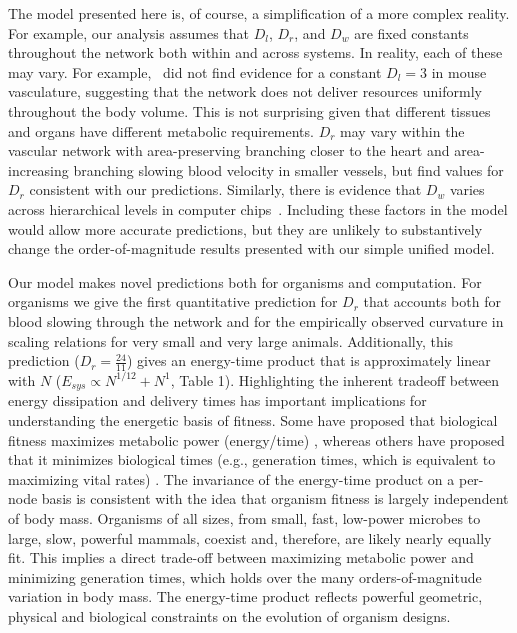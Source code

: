 \documentclass[12pt]{article}
\begin{document}
The model presented here is, of course, a simplification of a more
complex reality. For example, our analysis assumes that $D_l$, $D_r$,
and $D_w$ are fixed constants throughout the network both within and
across systems. In reality, each of these may vary.  For
example,~\cite{newberry2015testing} did not find evidence for a
constant $D_l = 3$ in mouse vasculature, suggesting that the network
does not deliver resources uniformly throughout the body volume. This
is not surprising given that different tissues and organs have
different metabolic requirements. $D_r$ may vary
within the vascular network with area-preserving branching closer to the heart and area-increasing branching slowing blood velocity in smaller
vessels, but \cite{newberry2015testing} find values for $D_r$
consistent with our predictions.  Similarly, there is evidence that
$D_w$ varies across hierarchical levels in computer
chips~\cite{ozaktas2004information}. Including these factors in the
model would allow more accurate predictions, but they are unlikely to
substantively change the order-of-magnitude results presented
with our simple unified model.

Our model makes novel predictions both for organisms and
computation. For organisms we give the first quantitative prediction
for $D_r$ that accounts both for blood slowing through the network and
for the empirically observed curvature in scaling relations for very
small and very large animals. Additionally, 
this prediction ($D_r = \frac{24}{11}$) gives an energy-time product that is approximately linear with $N$ ($E_{sys} \propto N^{1/12} + N^1$, Table 1). Highlighting the inherent tradeoff between energy dissipation and delivery times 
has important implications for understanding the energetic basis of fitness.  Some have proposed that biological fitness
maximizes metabolic power (energy/time) \cite{lotka56, odum71}, whereas others
have proposed that it minimizes biological times (e.g., generation times, which
is equivalent to maximizing vital rates) \cite{lindstedt81, sibly91}. The
invariance of the energy-time product on a per-node basis is
consistent with the idea that organism fitness
is largely independent of body mass.  Organisms of all sizes, from
small, fast, low-power microbes to large, slow, powerful mammals, coexist and,
therefore, are likely nearly equally fit.  This implies a direct trade-off
between maximizing metabolic power and minimizing generation times, which holds
over the many orders-of-magnitude variation in body mass.  The energy-time
product reflects powerful geometric, physical and biological constraints on the
evolution of organism designs.
\end{document}
